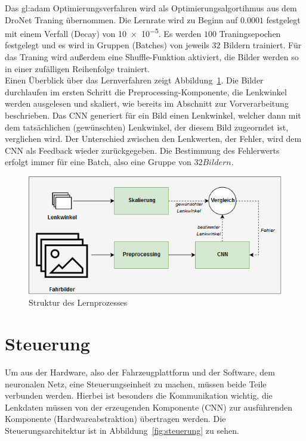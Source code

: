 Das \gls{gl:adam} Optimierungsverfahren \cite{kingma2014adam} wird als Optimierungsalgortihmus aus dem DroNet Traning übernommen.
Die Lernrate wird zu Beginn auf $0.0001$ festgelegt mit einem Verfall (Decay) von \num{10e-5}. Es werden $100$ Traningsepochen festgelegt und es wird in Gruppen (Batches) von jeweils $32$ Bildern trainiert. Für das Traning wird außerdem eine Shuffle-Funktion aktiviert, die Bilder werden so in einer zufälligen Reihenfolge trainiert.\\
Einen Überblick über das Lernverfahren zeigt Abbildung~\ref{img:lernarchitektur}. Die Bilder durchlaufen im ersten Schritt die Preprocessing-Komponente, die Lenkwinkel werden ausgelesen und skaliert, wie bereits im Abschnitt zur Vorverarbeitung beschrieben. Das CNN generiert für ein Bild einen Lenkwinkel, welcher dann mit dem tatsächlichen (gewünschten) Lenkwinkel, der diesem Bild zugeorndet ist, verglichen wird. Der Unterschied zwischen den Lenkwerten, der Fehler, wird dem CNN als Feedback wieder zurückgegeben. Die Bestimmung des Fehlerwerts erfolgt immer für eine Batch, also eine Gruppe von $32 Bildern$. 

\begin{figure}[h]
	\centering
	\includegraphics[width=\linewidth]{figures/Lernarchitektur.png}
	\caption{Struktur des Lernprozesses}
	\label{img:lernarchitektur}
\end{figure}

\newpage

\section{Steuerung}

Um aus der Hardware, also der Fahrzeugplattform und der Software, dem neuronalen Netz, eine Steuerungseinheit zu machen, müssen beide Teile verbunden werden. Hierbei ist besonders die Kommunikation wichtig, die Lenkdaten müssen von der erzeugenden Komponente (CNN) zur ausführenden Komponente (Hardwareabstraktion) übertragen werden. Die Steuerungsarchitektur ist in Abbildung~\ref{fig:steuerung} zu sehen.


